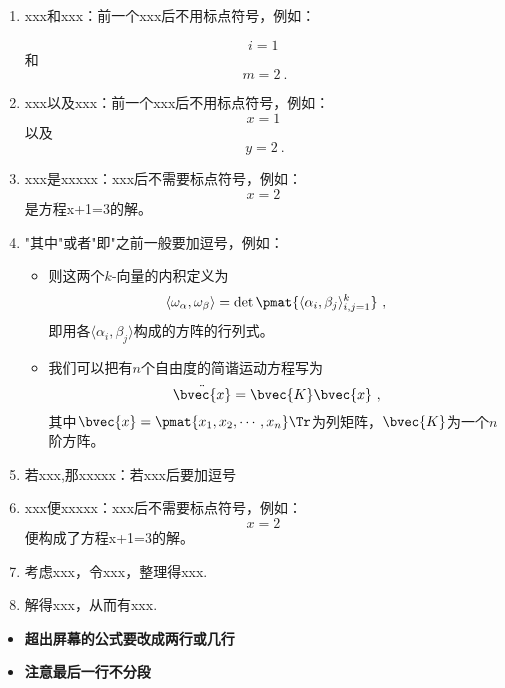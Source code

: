 \begin{enumerate}
\item xxx和xxx：前一个xxx后不用标点符号，例如：

\begin{equation}
i=1~
\end{equation}
和
\begin{equation}
m=2~.
\end{equation}
\item xxx以及xxx：前一个xxx后不用标点符号，例如：
\begin{equation}
x=1~
\end{equation}
以及
\begin{equation}
y=2~.
\end{equation}

 \item xxx是xxxxx：xxx后不需要标点符号，例如：
\begin{equation}
x=2~
\end{equation}
是方程x+1=3的解。
\item "其中"或者"即"之前一般要加逗号，例如：
\begin{itemize}
\item 则这两个$k$-向量的内积定义为
\begin{equation}
\langle\omega_\alpha, \omega_\beta\rangle = \det \pmat{\langle \alpha_i, \beta_j \rangle_{i, j=1}^k}~,
\end{equation}
即用各$\langle \alpha_i, \beta_j \rangle$构成的方阵的行列式。
\end{itemize}
\begin{itemize}
\item 
我们可以把有$n$个自由度的简谐运动方程写为
\begin{equation}
\ddot{\bvec{x}} = \bvec{K}\bvec{x}~,
\end{equation}
其中$\bvec{x}=\pmat{x_1, x_2, \cdots, x_n}\Tr$为列矩阵，$\bvec{K}$为一个$n$阶方阵。

\end{itemize}
\item 若xxx,那xxxxx：若xxx后要加逗号
\item xxx便xxxxx：xxx后不需要标点符号，例如：
\begin{equation}
x=2~
\end{equation}
便构成了方程x+1=3的解。
\item 考虑xxx，令xxx，整理得xxx.
\item 解得xxx，从而有xxx.
\end{enumerate}
\begin{itemize}
\item \textbf{超出屏幕的公式要改成两行或几行}
\end{itemize}


\begin{itemize}
\item \textbf{注意最后一行不分段}
\end{itemize}


